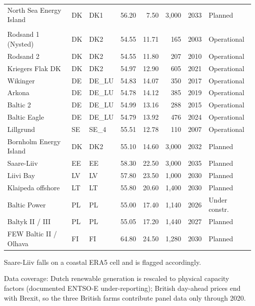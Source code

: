 \begin{table}[!htb]
\begin{threeparttable}
\begin{tabular}{l l l r r r r l}
North Sea Energy Island  & DK & DK1   & 56.20 & 7.50   & 3,000 & 2033 & Planned \\
\addlinespace
\multicolumn{8}{l}{\textit{Baltic (15 farms)}} \\
Rodsand 1 (Nysted)       & DK & DK2   & 54.55 & 11.71  & 165   & 2003 & Operational \\
Rodsand 2                & DK & DK2   & 54.55 & 11.80  & 207   & 2010 & Operational \\
Kriegers Flak DK         & DK & DK2   & 54.97 & 12.90  & 605   & 2021 & Operational \\
Wikinger                 & DE & DE\_LU & 54.83 & 14.07 & 350   & 2017 & Operational \\
Arkona                   & DE & DE\_LU & 54.78 & 14.12 & 385   & 2019 & Operational \\
Baltic 2                 & DE & DE\_LU & 54.99 & 13.16 & 288   & 2015 & Operational \\
Baltic Eagle             & DE & DE\_LU & 54.79 & 13.92 & 476   & 2024 & Operational \\
Lillgrund                & SE & SE\_4 & 55.51 & 12.78  & 110   & 2007 & Operational \\
Bornholm Energy Island   & DK & DK2   & 55.10 & 14.60  & 3,000 & 2032 & Planned \\
Saare-Liiv               & EE & EE    & 58.30 & 22.50  & 3,000 & 2035 & Planned\tnote{a} \\
Liivi Bay                & LV & LV    & 57.80 & 23.50  & 1,000 & 2030 & Planned \\
Klaipeda offshore        & LT & LT    & 55.80 & 20.60  & 1,400 & 2030 & Planned \\
Baltic Power             & PL & PL    & 55.00 & 17.40  & 1,140 & 2026 & Under constr. \\
Baltyk II / III          & PL & PL    & 55.05 & 17.20  & 1,440 & 2027 & Planned \\
FEW Baltic II / Olhava   & FI & FI    & 64.80 & 24.50  & 1,280 & 2030 & Planned \\
\bottomrule
\end{tabular}
\begin{tablenotes}\footnotesize
\item[a] Saare-Liiv falls on a coastal ERA5 cell and is flagged accordingly.
\item Data coverage: Dutch renewable generation is rescaled to physical capacity
factors (documented ENTSO-E under-reporting); British day-ahead prices end with
Brexit, so the three British farms contribute panel data only through 2020.
\end{tablenotes}
\end{threeparttable}
\end{table}


